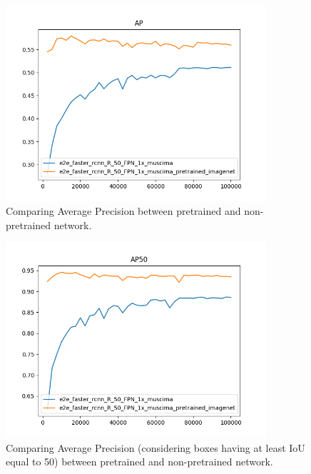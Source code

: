 \documentclass[journal]{IEEEtran}
\begin{document}
	\begin{figure} [h]
		\begin{center}
			\includegraphics[width=3.8in]{img/AP.png}
			\caption{Comparing Average Precision between pretrained and non-pretrained network.}
			\label{fig:AP}
		\end{center}
	\end{figure}
	
	\begin{figure} [h]
		\begin{center}
			\includegraphics[width=3.8in]{img/AP50.png}
			\caption{Comparing Average Precision (considering boxes having at least IoU equal to 50) between pretrained and non-pretrained network.}
			\label{fig:AP50}
		\end{center}
	\end{figure}
	
\end{document}
